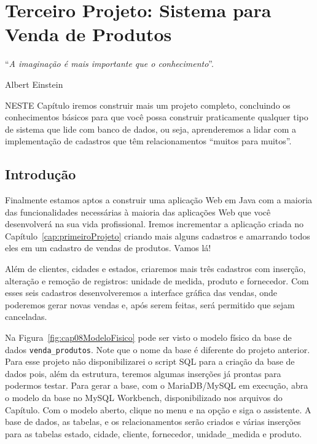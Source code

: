 \chapter{Terceiro Projeto: Sistema para Venda de Produtos}\label{cap:terceiroProjeto}
\epigraph{``\textit{A imaginação é mais importante que o conhecimento}''.}{Albert Einstein}

\lettrine[lines=4, lhang=0.1, lraise=0, loversize=0.2, findent=0.1em]{\textcolor{corAzulTema}{N}}{ESTE} Capítulo iremos construir mais um projeto completo, concluindo os conhecimentos básicos para que você possa construir praticamente qualquer tipo de sistema que lide com banco de dados, ou seja, aprenderemos a lidar com a implementação de cadastros que têm relacionamentos ``muitos para muitos''.


\section{Introdução}

Finalmente estamos aptos a construir uma aplicação Web em Java com a maioria das funcionalidades necessárias à maioria das aplicações Web que você desenvolverá na sua vida profissional. Iremos incrementar a aplicação criada no Capítulo~\ref{cap:primeiroProjeto} criando mais alguns cadastros e amarrando todos eles em um cadastro de vendas de produtos. Vamos lá!

Além de clientes, cidades e estados, criaremos mais três cadastros com inserção, alteração e remoção de registros: unidade de medida, produto e fornecedor. Com esses seis cadastros desenvolveremos a interface gráfica das vendas, onde poderemos gerar novas vendas e, após serem feitas, será permitido que sejam canceladas.

Na Figura~\ref{fig:cap08ModeloFisico} pode ser visto o modelo físico da base de dados \texttt{venda\_produtos}. Note que o nome da base é diferente do projeto anterior. Para esse projeto não disponibilizarei o script SQL para a criação da base de dados pois, além da estrutura, teremos algumas inserções já prontas para podermos testar. Para gerar a base, com o MariaDB/MySQL em execução, abra o modelo da base no MySQL Workbench, disponibilizado nos arquivos do Capítulo. Com o modelo aberto, clique no menu  e na opção  e siga o assistente. A base de dados, as tabelas, e os relacionamentos serão criados e várias inserções para as tabelas estado, cidade, cliente, fornecedor, unidade\_medida e produto.

